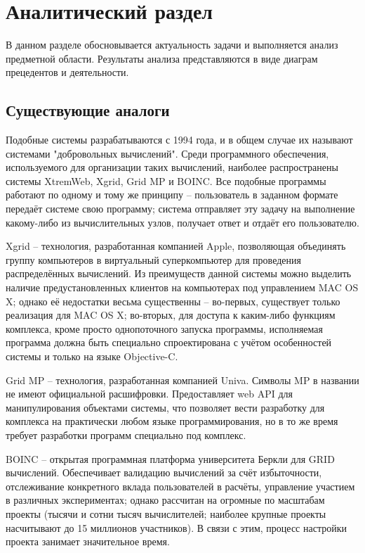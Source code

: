 \documentclass[a4paper,12pt]{report}
\numberwithin{equation}{section}
\begin{document}
  \clearpage
  \section{Аналитический раздел}
  
  В данном разделе обосновывается актуальность задачи и выполняется анализ предметной области.
  Результаты анализа представляются в виде диаграм прецедентов и деятельности.
  
  \subsection{Существующие аналоги}
  
  Подобные системы разрабатываются с 1994 года, и в общем случае их называют системами "добровольных вычислений".
  Среди программного обеспечения, используемого для организации таких вычислений, наиболее распространены системы XtremWeb, Xgrid, Grid MP и BOINC.
  Все подобные программы работают по одному и тому же принципу -- пользователь в заданном формате передаёт системе свою программу; система отправляет эту задачу на выполнение какому-либо из вычислительных узлов, получает ответ и отдаёт его пользователю.
  
  Xgrid\cite{xgrid} -- технология, разработанная компанией Apple, позволяющая объединять группу компьютеров в виртуальный суперкомпьютер для проведения распределённых вычислений. 
  Из преимуществ данной системы можно выделить наличие предустановленных клиентов на компьютерах под управлением MAC OS X; однако её недостатки весьма существенны -- во-первых, существует только реализация для MAC OS X; во-вторых, для доступа к каким-либо функциям комплекса, кроме просто однопоточного запуска программы, исполняемая программа должна быть специально спроектирована с учётом особенностей системы и только на языке Objective-C.
  
  Grid MP\cite{gridmp} -- технология, разработанная компанией Univa. Символы MP в названии не имеют официальной расшифровки. 
  Предоставляет web API для манипулирования объектами системы, что позволяет вести разработку для комплекса на практически любом языке программирования, но в то же время требует разработки программ специально под комплекс.
  
  BOINC\cite{boinc} -- открытая программная платформа университета Беркли для GRID вычислений. 
  Обеспечивает валидацию вычислений за счёт избыточности, отслеживание конкретного вклада пользователей в расчёты, управление участием в различных экспериментах; однако рассчитан на огромные по масштабам проекты (тысячи и сотни тысяч вычислителей; наиболее крупные проекты насчитывают до 15 миллионов участников). 
  В связи с этим, процесс настройки проекта занимает значительное время.
  
\end{document}
